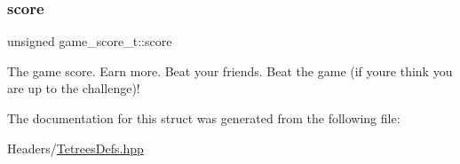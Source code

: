 \subsubsection{\texorpdfstring{score}{score}}
{\footnotesize\ttfamily unsigned game\+\_\+score\+\_\+t\+::score}

The game score. Earn more. Beat your friends. Beat the game (if you\textquotesingle{}re think you are up to the challenge)! 

The documentation for this struct was generated from the following file\+:\begin{DoxyCompactItemize}
\item 
Headers/\mbox{\hyperlink{TetreesDefs_8hpp}{Tetrees\+Defs.\+hpp}}\end{DoxyCompactItemize}
